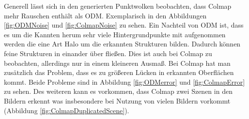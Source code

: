 \documentclass[12pt,titlepage, twoside]{article}
\begin{document}
Generell lässt sich in den generierten Punktwolken beobachten, dass Colmap mehr Rauschen enthält als ODM. Exemplarisch in den Abbildungen \ref{fig:ODMNoise} und \ref{fig:ColmapNoise} zu sehen. 
Ein Nachteil von ODM ist, dass es um die Kannten herum sehr viele Hintergrundpunkte mit aufgenommen werden die eine Art Halo um die erkannten Strukturen bilden. Dadurch können feine Strukturen in einander über fließen. Dies ist auch bei Colmap zu beobachten, allerdings nur in einem kleineren Ausmaß.
Bei Colmap hat man zusätzlich das Problem, dass es zu größeren Lücken in erkannten Oberflächen kommt.
Beide Probleme sind in Abbildung \ref{fig:ODMerror} und \ref{fig:ColmapError} zu sehen. 
Des weiteren kann es vorkommen, dass Colmap zwei Szenen in den Bildern erkennt was insbesondere bei Nutzung von vielen Bildern vorkommt (Abbildung \ref{fig:ColmapDuplicatedScene}).
\end{document}
